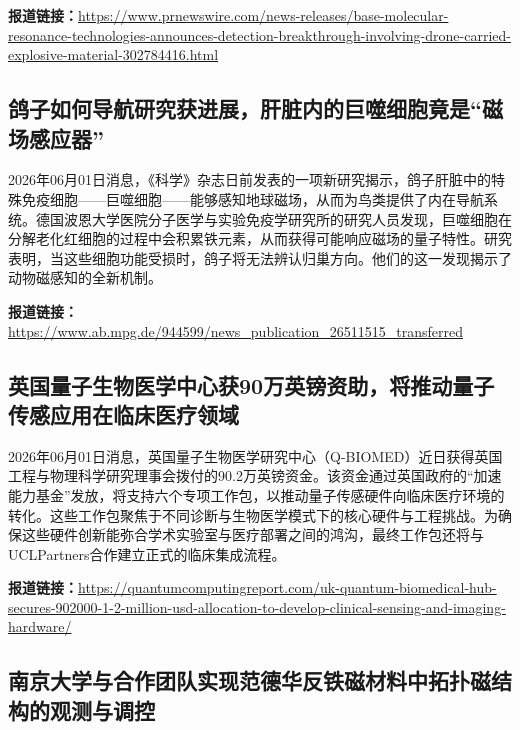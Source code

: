 \documentclass[12pt,a4paper]{ctexart}
\begin{document}
\noindent\textbf{报道链接：}\url{https://www.prnewswire.com/news-releases/base-molecular-resonance-technologies-announces-detection-breakthrough-involving-drone-carried-explosive-material-302784416.html}

\subsection{ 鸽子如何导航研究获进展，肝脏内的巨噬细胞竟是“磁场感应器” }

2026年06月01日消息，《科学》杂志日前发表的一项新研究揭示，鸽子肝脏中的特殊免疫细胞——巨噬细胞——能够感知地球磁场，从而为鸟类提供了内在导航系统。德国波恩大学医院分子医学与实验免疫学研究所的研究人员发现，巨噬细胞在分解老化红细胞的过程中会积累铁元素，从而获得可能响应磁场的量子特性。研究表明，当这些细胞功能受损时，鸽子将无法辨认归巢方向。他们的这一发现揭示了动物磁感知的全新机制。

\noindent\textbf{报道链接：}\url{https://www.ab.mpg.de/944599/news\_publication\_26511515\_transferred}

\subsection{ 英国量子生物医学中心获90万英镑资助，将推动量子传感应用在临床医疗领域 }

2026年06月01日消息，英国量子生物医学研究中心（Q-BIOMED）近日获得英国工程与物理科学研究理事会拨付的90.2万英镑资金。该资金通过英国政府的“加速能力基金”发放，将支持六个专项工作包，以推动量子传感硬件向临床医疗环境的转化。这些工作包聚焦于不同诊断与生物医学模式下的核心硬件与工程挑战。为确保这些硬件创新能弥合学术实验室与医疗部署之间的鸿沟，最终工作包还将与 UCLPartners合作建立正式的临床集成流程。

\noindent\textbf{报道链接：}\url{https://quantumcomputingreport.com/uk-quantum-biomedical-hub-secures-902000-1-2-million-usd-allocation-to-develop-clinical-sensing-and-imaging-hardware/}

\subsection{ 南京大学与合作团队实现范德华反铁磁材料中拓扑磁结构的观测与调控 }
\end{document}
